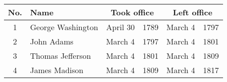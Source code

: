 \begin{tabular}{c|l r@{,}l @{$\rightarrow$} r@{,}l}
	No. & Name & \multicolumn{2}{c}{Took office} & \multicolumn{2}{c}{Left
office}\\
	\hline
	\hline
	1 & George Washington & April 30 & 1789 & March 4 & 1797\\
	2 & John Adams & March 4& 1797 & March 4& 1801\\
	3 & Thomas Jefferson & March 4& 1801 & March 4& 1809\\
	4 & James Madison & March 4& 1809 & March 4& 1817\\
\end{tabular}
